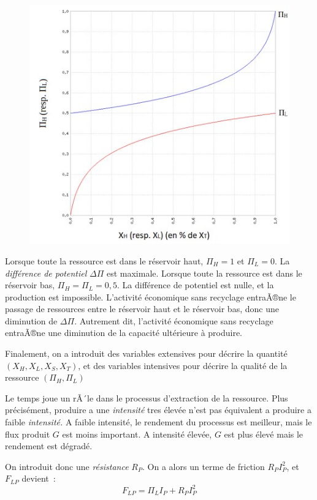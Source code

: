 \documentclass[12pt,a4paper]{article}%
\begin{document}
\begin{figure}[h]
\centering
\includegraphics[width=1.0\textwidth]{figures/Potentiels.jpg}\end{figure}

Lorsque toute la ressource est dans le réservoir haut, $\Pi_{H}=1$ et $\Pi
_{L}=0$. La \textit{différence de potentiel }$\Delta\Pi$ est maximale. Lorsque
toute la ressource est dans le réservoir bas, $\Pi_{H}=\Pi_{L}=0,5$. La
différence de potentiel est nulle, et la production est impossible. L'activité
économique sans recyclage entraÃ®ne le passage de ressources entre le réservoir
haut et le réservoir bas, donc une diminution de $\Delta\Pi$. Autrement dit,
l'activité économique sans recyclage entraÃ®ne une diminution de la capacité
ultérieure à produire.

Finalement, on a introduit des variables extensives pour décrire la quantité
$(X_{H},X_{L},X_{S},X_{T})$, et des variables intensives pour décrire la
qualité de la ressource $(\Pi_{H},\Pi_{L})$

Le temps joue un rÃ´le dans le processus d'extraction de la ressource. Plus
précisément, produire a une \textit{intensité }tres élevée n'est pas
équivalent a produire a faible \textit{intensité.} A faible intensité, le
rendement du processus est meilleur, mais le flux produit $G$ est moins
important. A intensité élevée, $G$ est plus élevé mais le rendement est dégradé.

On introduit donc une \textit{résistance} $R_{P}$. On a alors un terme de
friction $R_{P}I_{P}^{2}$, et $F_{LP}$
devient~:$\ \ \ \ \ \ \ \ \ \ \ \ \ \ \ \ $%
\[
F_{LP}=\Pi_{L}I_{P}+R_{P}I_{P}^{2}%
\]
\end{document}
